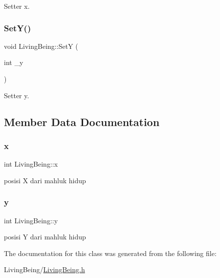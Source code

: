 Setter x. 

\mbox{\label{classLivingBeing_a69e58a8fb18b45d41b308dab4f654a37}} 
\subsubsection{\texorpdfstring{SetY()}{SetY()}}
{\footnotesize\ttfamily void Living\+Being\+::\+SetY (\begin{DoxyParamCaption}\item[{int}]{\+\_\+y }\end{DoxyParamCaption})}



Setter y. 



\subsection{Member Data Documentation}
\mbox{\label{classLivingBeing_a5007230d07e60ebd845dfd87ddc4a5e0}} 
\subsubsection{\texorpdfstring{x}{x}}
{\footnotesize\ttfamily int Living\+Being\+::x\hspace{0.3cm}{\ttfamily [protected]}}



posisi X dari mahluk hidup 

\mbox{\label{classLivingBeing_a3c8a9e6124ef52ea0554bc14e20b7486}} 
\subsubsection{\texorpdfstring{y}{y}}
{\footnotesize\ttfamily int Living\+Being\+::y\hspace{0.3cm}{\ttfamily [protected]}}



posisi Y dari mahluk hidup 



The documentation for this class was generated from the following file\+:\begin{DoxyCompactItemize}
\item 
Living\+Being/\mbox{\hyperlink{LivingBeing_8h}{Living\+Being.\+h}}\end{DoxyCompactItemize}
